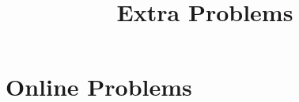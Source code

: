\documentclass{ximera}
\title{Extra Problems}
\begin{document}
\begin{abstract}
\end{abstract}
\maketitle
\section{Online Problems}
%
%
%
%
%
%
%
%
%
%
%
%
%
%
%
%
%
%
%
%
%
%
%
%
%
%
%
%
%
%
%
%
\end{document}
